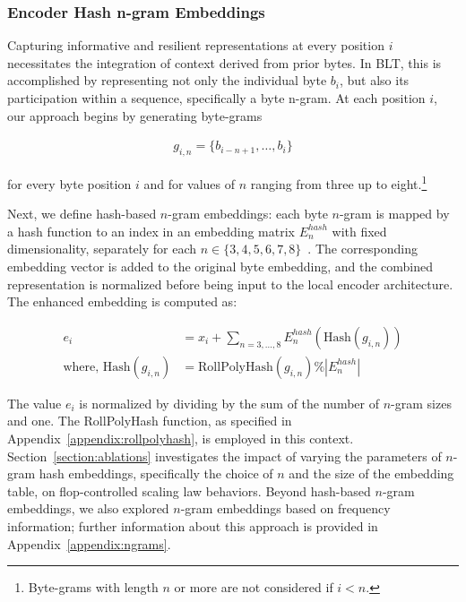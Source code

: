 \subsubsection{Encoder Hash n-gram Embeddings}
\label{sec:ngram-emb}
\label{sec:hash-emb}
Capturing informative and resilient representations at every position $i$ necessitates the integration of context derived from prior bytes. In {\textsc BLT}, this is accomplished by representing not only the individual byte $b_i$, but also its participation within a sequence, specifically a byte n-gram. At each position $i$, our approach begins by generating byte-grams

\begin{align}
    g_{i,n}=\{b_{i-n + 1},\ldots, b_i\}
\end{align}

for every byte position $i$ and for values of $n$ ranging from three up to eight.\footnote{
Byte-grams with length $n$ or more are not considered if $i<n$. }

Next, we define hash-based $n$-gram embeddings: each byte $n$-gram is mapped by a hash function to an index in an embedding matrix $E_{n}^{hash}$ with fixed dimensionality, separately for each $n \in\{3,4,5,6,7,8\}$~\citep{bai2010learning}. The corresponding embedding vector is added to the original byte embedding, and the combined representation is normalized before being input to the local encoder architecture. The enhanced embedding is computed as:

\begin{align}
e_i &= x_i + \sum_{n = 3,...,8}E_{n}^{hash}(\text{Hash}(g_{i,n})) \\
\text{where, Hash}(g_{i,n}) &= \text{RollPolyHash}(g_{i,n}) \% |E_{n}^{hash}|
\end{align}

The value $e_i$ is normalized by dividing by the sum of the number of $n$-gram sizes and one. The RollPolyHash function, as specified in Appendix~\ref{appendix:rollpolyhash}, is employed in this context. Section~\ref{section:ablations} investigates the impact of varying the parameters of $n$-gram hash embeddings, specifically the choice of $n$ and the size of the embedding table, on flop-controlled scaling law behaviors. Beyond hash-based $n$-gram embeddings, we also explored $n$-gram embeddings based on frequency information; further information about this approach is provided in Appendix~\ref{appendix:ngrams}.

